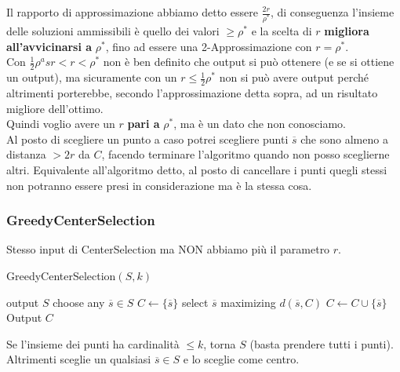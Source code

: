 \newpage

Il rapporto di approssimazione abbiamo detto essere $\frac{2r}{\rho^\ast}$, di conseguenza l'insieme delle soluzioni ammissibili è quello dei valori $\geq \rho^\ast$ e la scelta di $r$ \textbf{migliora all'avvicinarsi a} $\rho^\ast$, fino ad essere una 2-Approssimazione con $r = \rho^\ast$.\\

Con $ \frac{1}{2}\rho^asr < r < \rho^\ast$ non è ben definito che output si può ottenere (e se si ottiene un output), ma sicuramente con un $r \leq \frac{1}{2} \rho^\ast$ non si può avere output perché altrimenti porterebbe, secondo l'approssimazione detta sopra, ad un risultato migliore dell'ottimo.\\

Quindi voglio avere un $r$ \textbf{pari a} $\rho^\ast$, ma è un dato che non conosciamo.\\

Al posto di scegliere un punto a caso potrei scegliere punti $\overline{s}$ che sono almeno a distanza $> 2r$ da $C$, facendo terminare l'algoritmo quando non posso sceglierne altri. Equivalente all'algoritmo detto, al posto di cancellare i punti quegli stessi non potranno essere presi in considerazione ma è la stessa cosa.\\

\newpage

\subsubsection{GreedyCenterSelection}
Stesso input di CenterSelection ma NON abbiamo più il parametro $r$.\\

\begin{algorithm}
	\caption{GreedyCenterSelection$(S, k)$}
	\begin{algorithmic}
		\STATE output $S$
		\ENDIF
		\STATE choose any $\overline{s} \in S$
		\STATE $C \leftarrow \{ \overline{s}\}$ 
		\STATE select $\overline{s}$ maximizing $d(\overline{s}, C)$
		\STATE $C \leftarrow C \cup \{\overline{s}\}$
		\ENDWHILE
		\STATE Output $C$
	\end{algorithmic}
\end{algorithm}


Se l'insieme dei punti ha cardinalità $\leq k$, torna $S$ (basta prendere tutti i punti). Altrimenti sceglie un qualsiasi $\overline{s} \in S$ e lo sceglie come centro.\\

